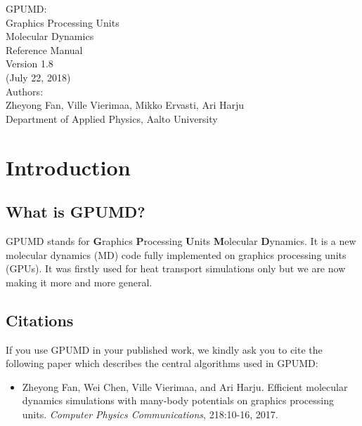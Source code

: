 \documentclass[12pt,a4paper]{report}
\begin{document}
\begin{center}
  \huge
  {
   \vspace*{1.0cm}
   GPUMD: \\
   Graphics Processing Units \\
   Molecular Dynamics\\
   \vspace*{1.0cm}
   Reference Manual\\
   \vspace*{1.0cm}
   Version 1.8\\
   \vspace*{1.0cm}
   (July 22, 2018)\\
  \vspace*{2.0cm}
  }
  \large
  {
  Authors: \\
  Zheyong Fan,
  Ville Vierimaa,
  Mikko Ervasti,
  Ari Harju \\
  Department of Applied Physics, Aalto University
  }
  \vspace*{1.0cm}
\end{center}


\tableofcontents


\chapter{Introduction}


\section{What is GPUMD?}

GPUMD stands for \textbf{G}raphics \textbf{P}rocessing \textbf{U}nits \textbf{M}olecular \textbf{D}ynamics. It is a new molecular dynamics (MD) code fully implemented on graphics processing units (GPUs). It was firstly used for heat transport simulations only but we are now making it more and more general.


\section{Citations}

If you use GPUMD in your published work, we kindly ask you to cite the following paper which describes the central algorithms used in GPUMD:

\begin{itemize}
\item Zheyong Fan, Wei Chen, Ville Vierimaa, and Ari Harju. Efficient molecular
dynamics simulations with many-body potentials on graphics processing units.
\textit{Computer Physics Communications}, 218:10-16, 2017.
\end{itemize}
\end{document}
